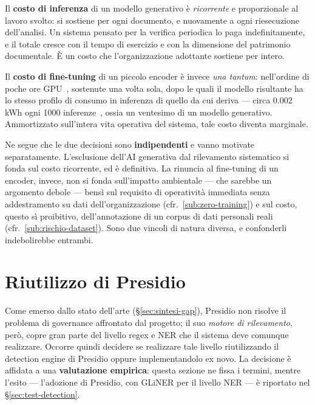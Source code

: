 Il \textbf{costo di inferenza} di un modello generativo è \emph{ricorrente} e proporzionale al lavoro svolto: si sostiene per ogni documento, e nuovamente a ogni riesecuzione dell'analisi. Un sistema pensato per la verifica periodica lo paga indefinitamente, e il totale cresce con il tempo di esercizio e con la dimensione del patrimonio documentale. È un costo che l'organizzazione adottante sostiene per intero. \medskip

Il \textbf{costo di fine-tuning} di un piccolo encoder è invece \emph{una tantum}: nell'ordine di poche ore GPU~\cite{zambareFairEfficientDeidentification2026}, sostenute una volta sola, dopo le quali il modello risultante ha lo stesso profilo di consumo in inferenza di quello da cui deriva --- circa 0.002\,kWh ogni 1000 inferenze~\cite{luccioni2024energy}, ossia un ventesimo di un modello generativo. Ammortizzato sull'intera vita operativa del sistema, tale costo diventa marginale. \medskip

Ne segue che le due decisioni sono \textbf{indipendenti} e vanno motivate separatamente. L'esclusione dell'AI generativa dal rilevamento sistematico si fonda sul costo ricorrente, ed è definitiva. La rinuncia al fine-tuning di un encoder, invece, non si fonda sull'impatto ambientale --- che sarebbe un argomento debole --- bensì sul requisito di operatività immediata senza addestramento su dati dell'organizzazione (cfr.~\ref{sub:zero-training}) e sul costo, questo sì proibitivo, dell'annotazione di un corpus di dati personali reali (cfr.~\ref{sub:rischio-dataset}). Sono due vincoli di natura diversa, e confonderli indebolirebbe entrambi.

\section{Riutilizzo di Presidio}
\label{sec:valutazione-presidio}

Come emerso dallo stato dell'arte (§\ref{sec:sintesi-gap}), Presidio non risolve il problema di governance affrontato dal progetto; il suo \textit{motore di rilevamento}, però, copre gran parte del livello regex e NER che il sistema deve comunque realizzare. Occorre quindi decidere se realizzare tale livello riutilizzando il detection engine di Presidio oppure implementandolo ex novo. La decisione è affidata a una \textbf{valutazione empirica}: questa sezione ne fissa i termini, mentre l'esito --- l'adozione di Presidio, con GLiNER per il livello NER --- è riportato nel §\ref{sec:test-detection}.


